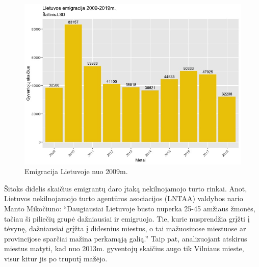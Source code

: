 \documentclass[11pt, titlepage]{article}
\begin{document}
\begin{figure}[H]
\center
\includegraphics[scale=0.5]{Rplot2}
\caption{Emigracija Lietuvoje nuo 2009m. }
\label{fig:Rplot2}
\end{figure}
\par
Šitoks didelis skaičius emigrantų daro įtaką nekilnojamojo turto rinkai. Anot, Lietuvos nekilnojamojo turto agentūros asociacijos (LNTAA) valdybos nario Manto Mikočiūno: “Daugiausiai Lietuvoje būsto nuperka 25-45 amžiaus žmonės, tačiau ši piliečių grupė dažniausiai ir emigruoja. Tie, kurie nusprendžia grįžti į tėvynę, dažniausiai grįžta į didesnius miestus, o tai mažuosiuose miestuose ar provincijose sparčiai mažina perkamąją galią.” Taip pat, analizuojant atskirus miestus matyti, kad nuo 2013m. gyventojų skaičius augo tik Vilniaus mieste, visur kitur jis po truputį mažėjo. 
\end{document}

